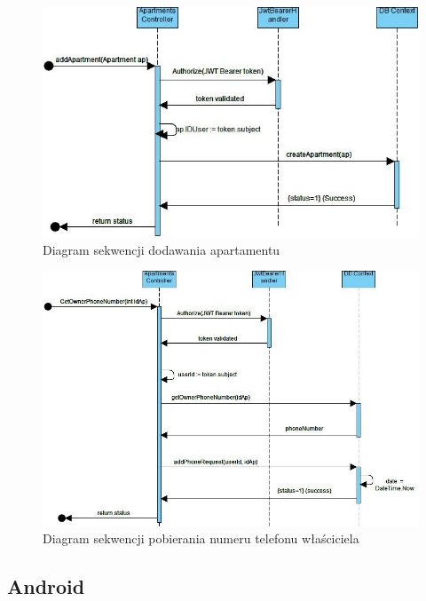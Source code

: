 \documentclass[polish, 11pt]{article}
\begin{document}
        \begin{figure}[H]
            \centering
            \includegraphics[width=\textwidth]{figures/addApartmentSeq.jpg}
            \caption{Diagram sekwencji dodawania apartamentu}
        \end{figure}
        
        \begin{figure}[H]
            \centering
            \includegraphics[width=\textwidth]{figures/getPhoneSeq.jpg}
            \caption{Diagram sekwencji pobierania numeru telefonu właściciela}
        \end{figure}
    
    \subsection{Android}
    
\end{document}
